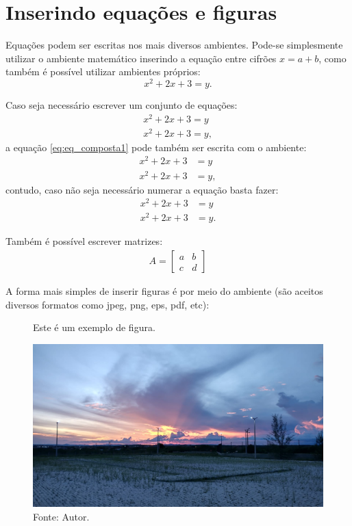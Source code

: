 \documentclass[
	12pt,				%
	openany,
    oneside,			%
	a4paper,			%
	chapter=TITLE,		%
	french,				%
	spanish,			%
	english				%
	]{ifce-relatorio-abntex2}
\begin{document}
\section{Inserindo equações e figuras} \label{sec:Eq_fig}

 Equações podem ser escritas nos mais diversos ambientes. Pode-se simplesmente utilizar o ambiente matemático inserindo a equação entre cifrões $x=a+b$, como também é possível utilizar ambientes próprios:
 \begin{equation} \label{eq:eq_simples}
     x^2+2x+3=y.
 \end{equation}
 
 Caso seja necessário escrever um conjunto de equações:
  \begin{eqnarray} \label{eq:eq_composta1}
     x^2+2x+3=y\\
     x^2+2x+3=y,
 \end{eqnarray}
 \noindent
 a equação \eqref{eq:eq_composta1} pode também ser escrita com o ambiente:
  \begin{align} \label{eq:eq_composta2}
     x^2+2x+3&=y\\
     x^2+2x+3&=y,
  \end{align}
\noindent
contudo, caso não seja necessário numerar a equação basta fazer:
  \begin{align*} 
     x^2+2x+3&=y\\
     x^2+2x+3&=y.
  \end{align*}

Também é possível escrever matrizes:
\begin{align} \label{eq:ex_matriz}
    A = \left[\begin{array}{cc}
        a & b\\
        c & d
    \end{array}\right]
\end{align}
\noindent

A forma mais simples de inserir figuras é por meio do ambiente (são aceitos diversos formatos como jpeg, png, eps, pdf, etc):
\begin{figure}[H]
    \centering
    \caption{Este é um exemplo de figura.}
    \includegraphics[scale=0.2]{Figuras/por_do_sol.jpeg}
	\captionsetup{font=small}
	\caption*{Fonte: Autor.}
    \label{fig:por_do_sol}
\end{figure}
\end{document}
